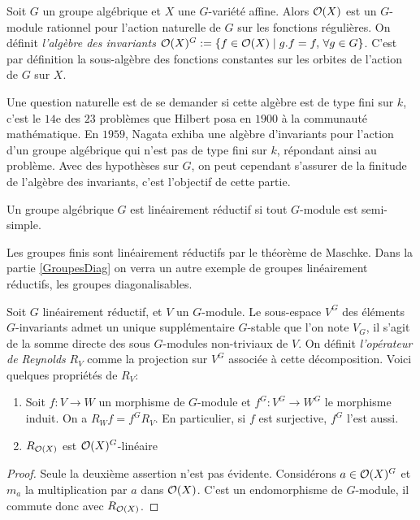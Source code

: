 Soit $G$ un groupe algébrique et $X$ une $G$-variété affine. Alors $\mathcal{O}(X)$ est un $G$-module rationnel pour l'action naturelle de $G$ sur les fonctions régulières. On définit \textit{l'algèbre des invariants} $\mathcal{O}(X)^G:=\lbrace f\in \mathcal{O}(X)\mid g.f=f,\, \forall g\in G\rbrace$. C'est par définition la sous-algèbre des fonctions constantes sur les orbites de l'action de $G$ sur $X$.

Une question naturelle est de se demander si cette algèbre est de type fini sur $k$, c'est le $14$e des $23$ problèmes que Hilbert posa en $1900$ à la communauté mathématique. En $1959$, Nagata exhiba une algèbre d'invariants pour l'action d'un groupe algébrique qui n'est pas de type fini sur $k$, répondant ainsi au problème. Avec des hypothèses sur $G$, on peut cependant s'assurer de la finitude de l'algèbre des invariants, c'est l'objectif de cette partie.

\begin{defn}
Un groupe algébrique $G$ est linéairement réductif si tout $G$-module est semi-simple.
\end{defn}

\begin{ex}\label{ExGpLinReductive}
Les groupes finis sont linéairement réductifs par le théorème de Maschke. Dans la partie \ref{GroupesDiag} on verra un autre exemple de groupes linéairement réductifs, les groupes diagonalisables.
\end{ex}

Soit $G$ linéairement réductif, et $V$ un $G$-module. Le sous-espace $V^G$ des éléments $G$-invariants admet un unique supplémentaire $G$-stable que l'on note $V_G$, il s'agit de la somme directe des sous $G$-modules non-triviaux de $V$. On définit \textit{l'opérateur de Reynolds} $R_V$ comme la projection sur $V^G$ associée à cette décomposition. Voici quelques propriétés de $R_V$:


\begin{prop}\label{reynolds}
\begin{enumerate}
\item Soit $f:V \rightarrow W$ un morphisme de $G$-module et $f^G:V^G \rightarrow W^G$ le morphisme induit. On a $R_Wf=f^GR_V$. En particulier, si $f$ est surjective, $f^G$ l'est aussi.
\item $R_{\mathcal{O}(X)}$ est $\mathcal{O}(X)^G$-linéaire
\end{enumerate}
\end{prop}
\begin{proof}
Seule la deuxième assertion n'est pas évidente. Considérons $a\in \mathcal{O}(X)^G$ et $m_a$ la multiplication par $a$ dans $\mathcal{O}(X)$. C'est un endomorphisme de $G$-module, il commute donc avec $R_{\mathcal{O}(X)}$. 
\end{proof}

